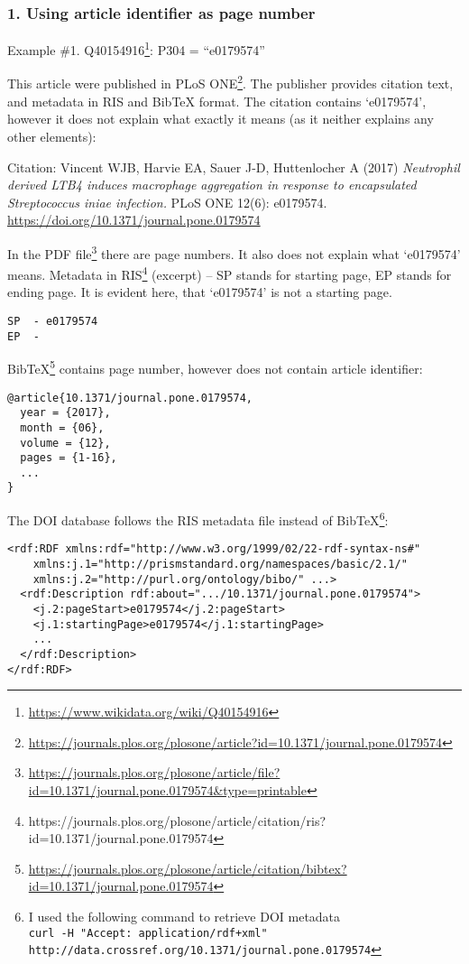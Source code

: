 \subsubsection{1. Using article identifier as page number}

Example \#1. Q40154916\footnote{\url{https://www.wikidata.org/wiki/Q40154916}}: P304 = ``e0179574''

This article were published in PLoS ONE\footnote{\url{https://journals.plos.org/plosone/article?id=10.1371/journal.pone.0179574}}. The publisher provides citation text, and metadata in RIS and BibTeX format. The citation contains `e0179574', however it does not explain what exactly it means (as it neither explains any other elements):

Citation: Vincent WJB, Harvie EA, Sauer J-D, Huttenlocher A (2017) \emph{Neutrophil derived LTB4 induces macrophage aggregation in response to encapsulated Streptococcus iniae infection.} PLoS ONE 12(6): e0179574. \url{https://doi.org/10.1371/journal.pone.0179574}

In the PDF file\footnote{\url{https://journals.plos.org/plosone/article/file?id=10.1371/journal.pone.0179574&type=printable}} there are page numbers. It also does not explain what `e0179574' means. Metadata in RIS\footnote{https://journals.plos.org/plosone/article/citation/ris?id=10.1371/journal.pone.0179574} (excerpt) -- SP stands for starting page, EP stands for ending page. It is evident here, that `e0179574' is not a starting page. 
\begin{lstlisting}
SP  - e0179574
EP  - 
\end{lstlisting}

BibTeX\footnote{\url{https://journals.plos.org/plosone/article/citation/bibtex?id=10.1371/journal.pone.0179574}} contains page number, however does not contain article identifier:
\begin{lstlisting}
@article{10.1371/journal.pone.0179574,
  year = {2017},
  month = {06},
  volume = {12},
  pages = {1-16},
  ...
}
\end{lstlisting}

The DOI database follows the RIS metadata file instead of BibTeX\footnote{I used the following command to retrieve DOI metadata\\
\texttt{curl -H "Accept: application/rdf+xml" \\ http://data.crossref.org/10.1371/journal.pone.0179574}}:

\begin{lstlisting}
<rdf:RDF xmlns:rdf="http://www.w3.org/1999/02/22-rdf-syntax-ns#"
    xmlns:j.1="http://prismstandard.org/namespaces/basic/2.1/"
    xmlns:j.2="http://purl.org/ontology/bibo/" ...>
  <rdf:Description rdf:about=".../10.1371/journal.pone.0179574">
    <j.2:pageStart>e0179574</j.2:pageStart>
    <j.1:startingPage>e0179574</j.1:startingPage>
    ...
  </rdf:Description>
</rdf:RDF>
\end{lstlisting}

